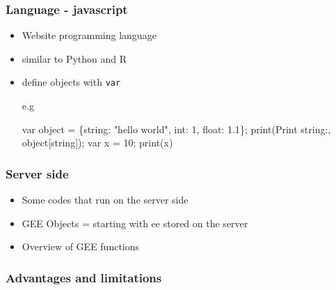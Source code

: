 \documentclass[
  letterpaper,
  DIV=11,
  numbers=noendperiod]{scrreprt}
\newenvironment{Shaded}{\begin{snugshade}}{\end{snugshade}}
\newcommand{\DataTypeTok}[1]{\textcolor[rgb]{0.68,0.00,0.00}{#1}}
\newcommand{\DecValTok}[1]{\textcolor[rgb]{0.68,0.00,0.00}{#1}}
\newcommand{\FloatTok}[1]{\textcolor[rgb]{0.68,0.00,0.00}{#1}}
\newcommand{\FunctionTok}[1]{\textcolor[rgb]{0.28,0.35,0.67}{#1}}
\newcommand{\KeywordTok}[1]{\textcolor[rgb]{0.00,0.23,0.31}{#1}}
\newcommand{\NormalTok}[1]{\textcolor[rgb]{0.00,0.23,0.31}{#1}}
\newcommand{\OperatorTok}[1]{\textcolor[rgb]{0.37,0.37,0.37}{#1}}
\newcommand{\StringTok}[1]{\textcolor[rgb]{0.13,0.47,0.30}{#1}}
\providecommand{\tightlist}{%
  \setlength{\itemsep}{0pt}\setlength{\parskip}{0pt}}\usepackage{longtable,booktabs,array}
\begin{document}
\hypertarget{language---javascript}{%
\subsubsection{Language - javascript}\label{language---javascript}}

\begin{itemize}
\item
  Website programming language
\item
  similar to Python and R
\item
  define objects with \texttt{var}

  e.g

\begin{Shaded}
\begin{Highlighting}[]
\KeywordTok{var}\NormalTok{ object }\OperatorTok{=}\NormalTok{ \{}\DataTypeTok{string}\OperatorTok{:} \StringTok{"hello world"}\OperatorTok{,} \DataTypeTok{int}\OperatorTok{:} \DecValTok{1}\OperatorTok{,} \DataTypeTok{float}\OperatorTok{:} \FloatTok{1.1}\NormalTok{\}}\OperatorTok{;}
\FunctionTok{print}\NormalTok{(}\StringTok{\textquotesingle{}Print string:\textquotesingle{}}\OperatorTok{,}\NormalTok{ object[}\StringTok{\textquotesingle{}string\textquotesingle{}}\NormalTok{])}\OperatorTok{;}
\KeywordTok{var}\NormalTok{ x }\OperatorTok{=} \DecValTok{10}\OperatorTok{;}
\FunctionTok{print}\NormalTok{(x)}
\end{Highlighting}
\end{Shaded}
\end{itemize}

\hypertarget{server-side}{%
\subsubsection{Server side}\label{server-side}}

\begin{itemize}
\tightlist
\item
  Some codes that run on the server side
\item
  GEE Objects = starting with ee stored on the server
\item
  Overview of GEE functions
\end{itemize}

\hypertarget{advantages-and-limitations}{%
\subsubsection{Advantages and
limitations}\label{advantages-and-limitations}}
\end{document}
